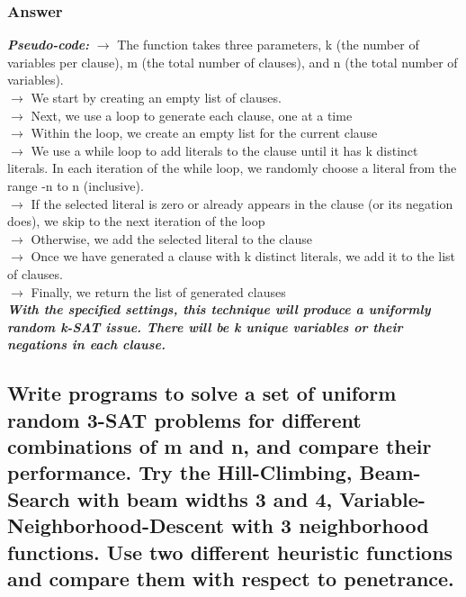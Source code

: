 \documentclass[15pt,journal]{IEEEtran}
\begin{document}
\subsubsection{\Large{\textbf{Answer}}\\}
\textbf{\textit{Pseudo-code:}} 
$\rightarrow$ The function takes three parameters, k (the number of variables per clause), m (the total number of clauses), and n (the total number of variables). \\
$\rightarrow$ We start by creating an empty list of clauses. \\
$\rightarrow$ Next, we use a loop to generate each clause, one at a time \\
$\rightarrow$ Within the loop, we create an empty list for the current clause \\
$\rightarrow$ We use a while loop to add literals to the clause until it has k distinct literals. In each iteration of the while loop, we randomly choose a literal from the range -n to n (inclusive). \\
$\rightarrow$ If the selected literal is zero or already appears in the clause (or its negation does), we skip to the next iteration of the loop \\
$\rightarrow$ Otherwise, we add the selected literal to the clause \\
$\rightarrow$ Once we have generated a clause with k distinct literals, we add it to the list of clauses. \\
$\rightarrow$ Finally, we return the list of generated clauses \\
\textbf{\textit{With the specified settings, this technique will produce a uniformly random k-SAT issue. There will be k unique variables or their negations in each clause.}}
\subsection{Write programs to solve a set of uniform random 3-SAT problems for different combinations of m and n, and compare their performance. Try the Hill-Climbing, Beam-Search with beam widths 3 and 4, Variable-Neighborhood-Descent with 3 neighborhood functions. Use two different heuristic functions and compare them with respect to penetrance.}
\end{document}
